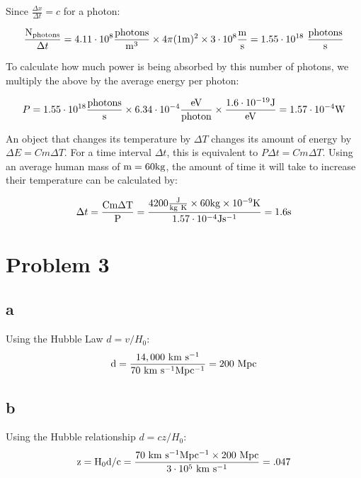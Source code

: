 \documentclass{article}
\begin{document}
Since $\frac{\Delta x}{\Delta t} = c$ for a photon:

\begin{equation*}
\frac{{\rm N_{photons}}}{\Delta t} = 4.11\cdot10^8 \rm{\frac{photons}{m^3}}\times 4\pi ({\rm 1m})^2 \times 3\cdot10^8{\rm \frac{m}{s}} = 1.55\cdot10^{18}~\frac{photons}{s}
\end{equation*}

To calculate how much power is being absorbed by this number of photons, we multiply the above by the average energy per photon:

\begin{equation*}
P = 1.55\cdot10^{18}{\rm \frac{photons}{s}}\times6.34\cdot10^{-4}{\rm\frac{eV}{photon}}\times{\rm \frac{1.6\cdot10^{-19}J}{eV}} = 1.57\cdot10^{-4}\rm W
\end{equation*}

An object that changes its temperature by $\Delta T$ changes its amount of energy by $ \Delta E = Cm\Delta T$. For a time interval $\Delta t$, this is equivalent to $P\Delta t = Cm\Delta T$. Using an average human mass of $\rm m=60kg$, the amount of time it will take to increase their temperature can be calculated by:

\begin{equation*}
\Delta t = \rm \frac{Cm\Delta T}{P} = \frac{4200\frac{J}{kg~K}\times60kg \times 10^{-9} K}{1.57\cdot10^{-4}Js^{-1}} = 1.6s
\end{equation*}



\section{Problem 3}

\subsection{a}
Using the Hubble Law $d = v/H_{0}$:
\begin{equation*}
\rm d =  \frac{14,000~km~s^{-1}}{70~km~s^{-1}Mpc^{-1}} = 200~Mpc
\end{equation*}

\subsection{b}
Using the Hubble relationship $d = cz/H_{0}:$
\begin{equation*}
\rm z = H_{0}d/c = \frac{70~km~s^{-1}Mpc^{-1}\times200~Mpc}{3\cdot10^5~km~s^{-1}} = .047
\end{equation*}
\newpage
\end{document}
